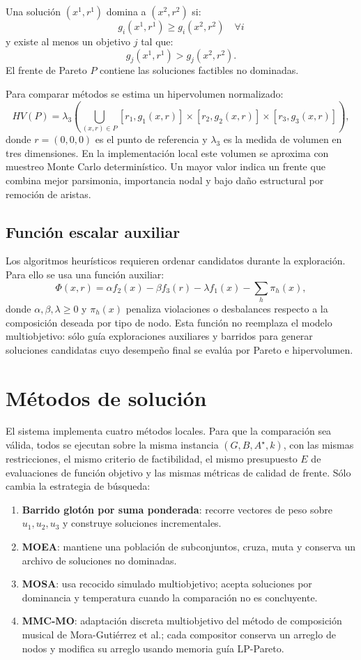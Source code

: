 \documentclass[11pt]{article}
\begin{document}
Una solución $(x^1,r^1)$ domina a $(x^2,r^2)$ si:
\[
g_i(x^1,r^1)\geq g_i(x^2,r^2)\quad \forall i
\]
y existe al menos un objetivo $j$ tal que:
\[
g_j(x^1,r^1)>g_j(x^2,r^2).
\]
El frente de Pareto $P$ contiene las soluciones factibles no dominadas.

Para comparar métodos se estima un hipervolumen normalizado:
\[
HV(P)=\lambda_3\left(\bigcup_{(x,r)\in P}
[r_1,g_1(x,r)]\times[r_2,g_2(x,r)]\times[r_3,g_3(x,r)]\right),
\]
donde $r=(0,0,0)$ es el punto de referencia y $\lambda_3$ es la medida de
volumen en tres dimensiones. En la implementación local este volumen se aproxima
con muestreo Monte Carlo determinístico. Un mayor valor indica un frente que
combina mejor parsimonia, importancia nodal y bajo daño estructural por remoción
de aristas.

\subsection{Función escalar auxiliar}

Los algoritmos heurísticos requieren ordenar candidatos durante la exploración.
Para ello se usa una función auxiliar:
\[
\Phi(x,r)=
\alpha f_2(x)
-\beta f_3(r)
-\lambda f_1(x)
-\sum_h \pi_h(x),
\]
donde $\alpha,\beta,\lambda\geq0$ y $\pi_h(x)$ penaliza violaciones o
desbalances respecto a la composición deseada por tipo de nodo. Esta función no
reemplaza el modelo multiobjetivo: sólo guía exploraciones auxiliares y barridos
para generar soluciones candidatas cuyo desempeño final se evalúa por Pareto e
hipervolumen.

\section{Métodos de solución}

El sistema implementa cuatro métodos locales. Para que la comparación sea
válida, todos se ejecutan sobre la misma instancia \((G,B,A^\star,k)\), con las
mismas restricciones, el mismo criterio de factibilidad, el mismo presupuesto
\(E\) de evaluaciones de función objetivo y las mismas métricas de calidad de
frente. Sólo cambia la estrategia de búsqueda:

\begin{enumerate}
  \item \textbf{Barrido glotón por suma ponderada}: recorre vectores de peso
  sobre \(u_1,u_2,u_3\) y construye soluciones incrementales.
  \item \textbf{MOEA}: mantiene una población de subconjuntos, cruza, muta y
  conserva un archivo de soluciones no dominadas.
  \item \textbf{MOSA}: usa recocido simulado multiobjetivo; acepta soluciones por
  dominancia y temperatura cuando la comparación no es concluyente.
  \item \textbf{MMC-MO}: adaptación discreta multiobjetivo del método de
  composición musical de Mora-Gutiérrez et al.; cada compositor conserva un
  arreglo de nodos y modifica su arreglo usando memoria guía LP-Pareto.
\end{enumerate}
\end{document}
